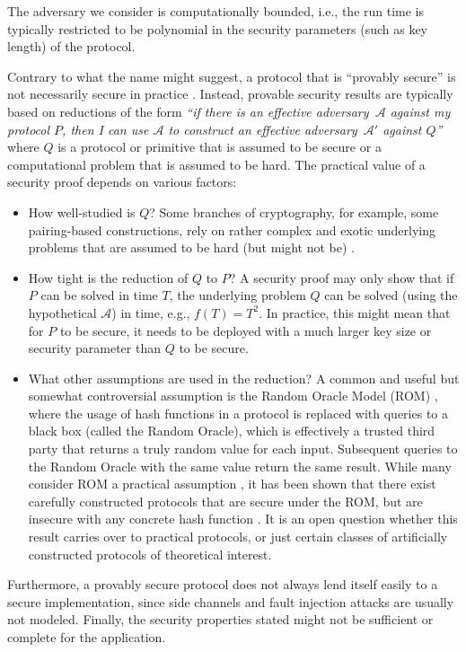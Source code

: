 The adversary we consider is computationally bounded, i.e., the run time is
typically restricted to be polynomial in the security parameters (such as key
length) of the protocol.

Contrary to what the name might suggest, a protocol that is ``provably secure''
is not necessarily secure in practice
\cite{koblitz2007another,damgaard2007proof}.  Instead, provable security
results are typically based on reductions of the form \emph{``if there is an
effective adversary~$\mathcal{A}$ against my protocol $P$, then I can use
$\mathcal{A}$ to construct an effective adversary~$\mathcal{A}'$ against
$Q$''} where $Q$ is a protocol or primitive that is assumed to be secure or a
computational problem that is assumed to be hard.  The practical value of a
security proof depends on various factors:
\begin{itemize}
  \item How well-studied is $Q$? Some branches of cryptography, for example,
    some pairing-based constructions, rely on rather complex and exotic
    underlying problems that are assumed to be hard (but might not be)
    \cite{koblitz2010brave}.
  \item How tight is the reduction of $Q$ to $P$?  A security proof may only
    show that if $P$ can be solved in time $T$, the underlying problem $Q$ can
    be solved (using the hypothetical $\mathcal{A}$) in time, e.g., $f(T) = T^2$.
    In practice, this might mean that for $P$ to be secure, it needs to be deployed
    with a much larger key size or security parameter than $Q$ to be secure.
  \item What other assumptions are used in the reduction?  A common and useful but
    somewhat controversial
    assumption is the Random Oracle Model (ROM) \cite{bellare1993random}, where
    the usage of hash functions in a protocol is replaced with queries to a
    black box (called the Random Oracle), which is effectively a trusted third
    party that returns a truly random value for each input.  Subsequent queries
    to the Random Oracle with the same value return the same result.  While
    many consider ROM a practical assumption
    \cite{koblitz2015random,bellare1993random}, it has been shown that there
    exist carefully constructed protocols that are secure under the ROM, but
    are insecure with any concrete hash function \cite{canetti2004random}.  It
    is an open question whether this result carries over to practical
    protocols, or just certain classes of artificially constructed protocols of
    theoretical interest.
\end{itemize}
Furthermore, a provably secure protocol does not always lend itself easily to a secure
implementation, since side channels and fault injection attacks \cite{hsueh1997fault,lomne2011side} are
usually not modeled. Finally, the security properties stated might
not be sufficient or complete for the application.

